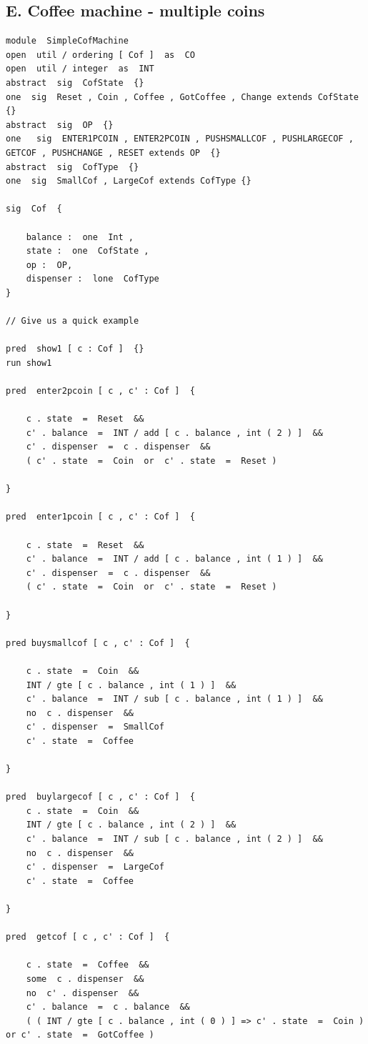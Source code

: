 \documentclass[a4paper,12pt]{extarticle}
\begin{document}
\subsection{E. Coffee machine - multiple coins}
\begin{verbatim}
module  SimpleCofMachine
open  util / ordering [ Cof ]  as  CO
open  util / integer  as  INT
abstract  sig  CofState  {}
one  sig  Reset , Coin , Coffee , GotCoffee , Change extends CofState {}
abstract  sig  OP  {}
one   sig  ENTER1PCOIN , ENTER2PCOIN , PUSHSMALLCOF , PUSHLARGECOF ,
GETCOF , PUSHCHANGE , RESET extends OP  {}
abstract  sig  CofType  {}
one  sig  SmallCof , LargeCof extends CofType {}

sig  Cof  {

	balance :  one  Int ,
	state :  one  CofState ,
	op :  OP,
	dispenser :  lone  CofType
}

// Give us a quick example

pred  show1 [ c : Cof ]  {}
run show1

pred  enter2pcoin [ c , c' : Cof ]  {

	c . state  =  Reset  &&
	c' . balance  =  INT / add [ c . balance , int ( 2 ) ]  &&
	c' . dispenser  =  c . dispenser  &&
	( c' . state  =  Coin  or  c' . state  =  Reset )
	
}

pred  enter1pcoin [ c , c' : Cof ]  {

	c . state  =  Reset  &&
	c' . balance  =  INT / add [ c . balance , int ( 1 ) ]  &&
	c' . dispenser  =  c . dispenser  &&
	( c' . state  =  Coin  or  c' . state  =  Reset )

}

pred buysmallcof [ c , c' : Cof ]  {

	c . state  =  Coin  &&
	INT / gte [ c . balance , int ( 1 ) ]  &&
	c' . balance  =  INT / sub [ c . balance , int ( 1 ) ]  &&
	no  c . dispenser  &&
	c' . dispenser  =  SmallCof
	c' . state  =  Coffee

}

pred  buylargecof [ c , c' : Cof ]  {
	c . state  =  Coin  &&
	INT / gte [ c . balance , int ( 2 ) ]  &&
	c' . balance  =  INT / sub [ c . balance , int ( 2 ) ]  &&
	no  c . dispenser  &&
	c' . dispenser  =  LargeCof
	c' . state  =  Coffee

}

pred  getcof [ c , c' : Cof ]  {

	c . state  =  Coffee  &&
	some  c . dispenser  &&
	no  c' . dispenser  &&
	c' . balance  =  c . balance  &&
	( ( INT / gte [ c . balance , int ( 0 ) ] => c' . state  =  Coin ) or c' . state  =  GotCoffee )
	

\end{verbatim}
\end{document}
